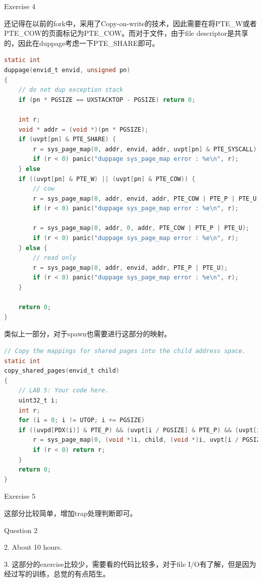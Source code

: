 \documentclass[GBK,winfonts,a4paper,10pt]{ctexart}
\begin{document}
\begin{section}{ Exercise 4 }
\par
还记得在以前的fork中，采用了Copy-on-write的技术，因此需要在将PTE\_W或者PTE\_COW的页面标记为PTE\_COW。而对于文件，由于file descriptor是共享的，因此在duppage考虑一下PTE\_SHARE即可。
\begin{lstlisting}[language = C]
static int
duppage(envid_t envid, unsigned pn)
{
	// do not dup exception stack
	if (pn * PGSIZE == UXSTACKTOP - PGSIZE) return 0;

	int r;
	void * addr = (void *)(pn * PGSIZE);
    if (uvpt[pn] & PTE_SHARE) {
        r = sys_page_map(0, addr, envid, addr, uvpt[pn] & PTE_SYSCALL);
        if (r < 0) panic("duppage sys_page_map error : %e\n", r);
    } else
	if ((uvpt[pn] & PTE_W) || (uvpt[pn] & PTE_COW)) {
		// cow
		r = sys_page_map(0, addr, envid, addr, PTE_COW | PTE_P | PTE_U);
		if (r < 0) panic("duppage sys_page_map error : %e\n", r);
		
		r = sys_page_map(0, addr, 0, addr, PTE_COW | PTE_P | PTE_U);
		if (r < 0) panic("duppage sys_page_map error : %e\n", r);
	} else {
		// read only
		r = sys_page_map(0, addr, envid, addr, PTE_P | PTE_U);
		if (r < 0) panic("duppage sys_page_map error : %e\n", r);
	}

	return 0;
}
\end{lstlisting}
\par
类似上一部分，对于spawn也需要进行这部分的映射。
\begin{lstlisting}[language = C]
// Copy the mappings for shared pages into the child address space.
static int
copy_shared_pages(envid_t child)
{
	// LAB 5: Your code here.
    uint32_t i;
    int r;
    for (i = 0; i != UTOP; i += PGSIZE) 
    if ((uvpd[PDX(i)] & PTE_P) && (uvpt[i / PGSIZE] & PTE_P) && (uvpt[i / PGSIZE] & PTE_SHARE)) {
        r = sys_page_map(0, (void *)i, child, (void *)i, uvpt[i / PGSIZE] & PTE_SYSCALL);
        if (r < 0) return r;
    }
	return 0;
}
\end{lstlisting}
\end{section}

\begin{section}{ Exercise 5 }
\par
这部分比较简单，增加trap处理判断即可。
\end{section}

\begin{section}{ Question 2 }
\par
2. About 10 hours.
\par
3. 这部分的exercise比较少，需要看的代码比较多，对于file I/O有了解，但是因为经过写的训练，总觉的有点陌生。
\end{section}
\end{document}
